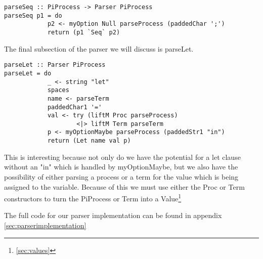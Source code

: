 \begin{verbatim}
parseSeq :: PiProcess -> Parser PiProcess
parseSeq p1 = do
            p2 <- myOption Null parseProcess (paddedChar ';')
            return (p1 `Seq` p2)
\end{verbatim}

The final subsection of the parser we will discuss is parseLet.

\begin{verbatim}
parseLet :: Parser PiProcess
parseLet = do
            _ <- string "let"
            spaces
            name <- parseTerm
            paddedChar1 '='
            val <- try (liftM Proc parseProcess) 
                    <|> liftM Term parseTerm
            p <- myOptionMaybe parseProcess (paddedStr1 "in") 
            return (Let name val p)
\end{verbatim}

This is interesting because not only do we have the potential for a let clause without an "in" which is handled by myOptionMaybe, but we also have the possibility of either parsing a process or a term for the value which is being assigned to the variable. Because of this we must use either the Proc or Term constructors to turn the PiProcess or Term into a Value\footnote{\ref{sec:values}}

The full code for our parser implementation can be found in appendix \ref{sec:parserimplementation}
